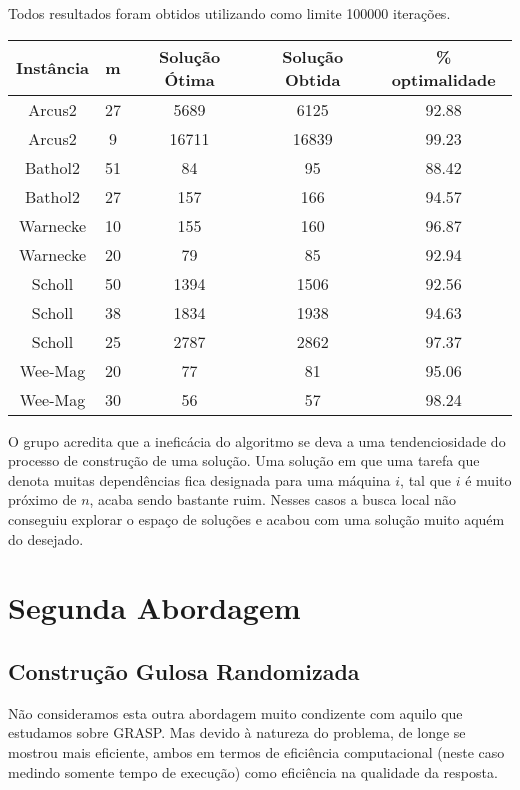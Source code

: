 \documentclass{report}
\begin{document}
Todos resultados foram obtidos utilizando como limite 100000 iterações.

\begin{table}[htbp]
 \begin{tabular}{|c|c|c|c|c|}
  \hline
  \textbf{Instância} & \textbf{m} & \textbf{Solução Ótima} & \textbf{Solução Obtida} & \% optimalidade \\
  \hline
  Arcus2 & 27 & 5689 & 6125 & 92.88 \\
  \hline
  Arcus2 & 9 & 16711 & 16839 & 99.23 \\
  \hline
  Bathol2 & 51 & 84 & 95 & 88.42 \\
  \hline
  Bathol2 & 27 & 157 & 166 & 94.57 \\
  \hline
  Warnecke & 10 & 155 & 160 & 96.87 \\
  \hline
  Warnecke & 20 & 79 & 85 & 92.94 \\
  \hline
  Scholl & 50 & 1394 & 1506 & 92.56 \\
  \hline
  Scholl & 38 & 1834 & 1938 & 94.63 \\
  \hline
  Scholl & 25 & 2787 & 2862 & 97.37 \\
  \hline
  Wee-Mag & 20 & 77 & 81 & 95.06 \\
  \hline
  Wee-Mag & 30 & 56 & 57 & 98.24 \\
  \hline
 \end{tabular}
\end{table}

O grupo acredita que a ineficácia do algoritmo se deva a uma tendenciosidade do
processo de construção de uma solução. Uma solução em que uma tarefa que denota
muitas dependências fica designada para uma máquina $i$, tal que $i$ é muito
próximo de $n$, acaba sendo bastante ruim. Nesses casos a busca local não
conseguiu explorar o espaço de soluções e acabou com uma solução muito aquém
do desejado.

\section{Segunda Abordagem}

\subsection{Construção Gulosa Randomizada}

Não consideramos esta outra abordagem muito condizente com aquilo que estudamos
sobre GRASP.
Mas devido à natureza do
problema, de longe se mostrou  mais eficiente, ambos em termos de
eficiência computacional (neste caso medindo
somente tempo de execução) como eficiência na qualidade da resposta.
\end{document}
